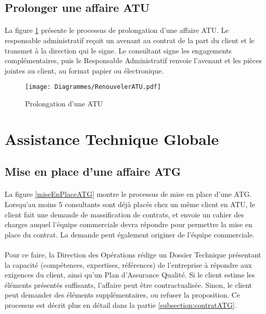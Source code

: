 \subsection{Prolonger une affaire ATU}

\paragraph{} La figure \ref{prolongerATU} présente le processus de prolongation d'une affaire ATU. Le responsable administratif reçoit un avenant au contrat de la part du client et le transmet à la direction qui le signe. Le consultant signe les engagements complémentaires, puis le Responsable Administratif renvoie l'avenant et les pièces jointes au client, au format papier ou électronique.

\begin{figure}[H]
	\centering
	\texttt{[image: Diagrammes/RenouvelerATU.pdf]}
	\caption{Prolongation d'une ATU} 
	\label{prolongerATU}
\end{figure}

\newpage

\section{Assistance Technique Globale}

\subsection{Mise en place d'une affaire ATG}

 \paragraph{} La figure \ref{miseEnPlaceATG} montre le processus de mise en place d'une ATG. Lorsqu'au moins 5 consultants sont déjà placés chez un même client en ATU, le client fait une demande de massification de contrats, et envoie un cahier des charges auquel l'équipe commerciale devra répondre pour permettre la mise en place du contrat. La demande peut également originer de l'équipe commerciale.
 \paragraph{} Pour ce faire, la Direction des Opérations rédige un Dossier Technique présentant la capacité (compétences, expertises, références) de l'entreprise à répondre aux exigences du client, ainsi qu'un Plan d'Assurance Qualité. Si le client estime les éléments présentés suffisants, l'affaire peut être contractualisée. Sinon, le client peut demander des éléments supplémentaires, ou refuser la proposition. Ce processus est décrit plus en détail dans la partie \ref{subsection:contratATG}.

